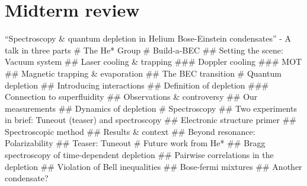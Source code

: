 \hypertarget{midterm-review}{%
\section{Midterm review}\label{midterm-review}}

``Spectroscopy \& quantum depletion in Helium Bose-Einstein
condensates'' - A talk in three parts \# The He* Group \# Build-a-BEC
\#\# Setting the scene: Vacuum system \#\# Laser cooling \& trapping
\#\#\# Doppler cooling \#\#\# MOT \#\# Magnetic trapping \& evaporation
\#\# The BEC transition \# Quantum depletion \#\# Introducing
interactions \#\# Definition of depletion \#\#\# Connection to
superfluidity \#\# Observations \& controversy \#\# Our measurements
\#\# Dynamics of depletion \# Spectroscopy \#\# Two experiments in
brief: Tuneout (teaser) and spectroscopy \#\# Electronic structure
primer \#\# Spectroscopic method \#\# Results \& context \#\# Beyond
resonance: Polarizability \#\# Teaser: Tuneout \# Future work from He*
\#\# Bragg spectroscopy of time-dependent depletion \#\# Pairwise
correlations in the depletion \#\# Violation of Bell inequalities \#\#
Bose-fermi mixtures \#\# Another condensate?
